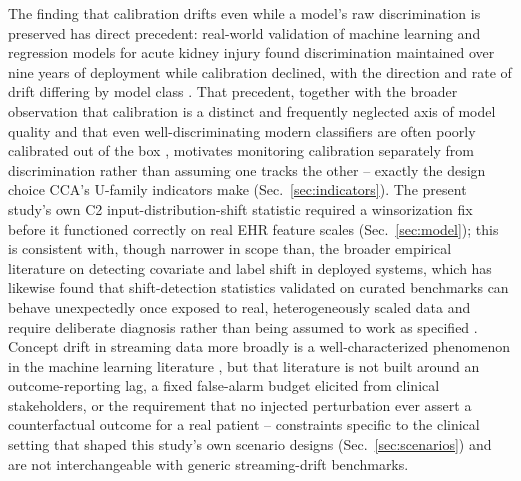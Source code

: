 \documentclass[preprintsapa,article,submit,oneauthor]{Definitions/mdpi}
\begin{document}
The finding that calibration drifts even while a model's raw discrimination is preserved has direct precedent: real-world validation of machine learning and regression models for acute kidney injury found discrimination maintained over nine years of deployment while calibration declined, with the direction and rate of drift differing by model class \citep{davis2017}. That precedent, together with the broader observation that calibration is a distinct and frequently neglected axis of model quality \citep{vancalster2019} and that even well-discriminating modern classifiers are often poorly calibrated out of the box \citep{guo2017}, motivates monitoring calibration separately from discrimination rather than assuming one tracks the other -- exactly the design choice CCA's U-family indicators make (Sec.~\ref{sec:indicators}). The present study's own C2 input-distribution-shift statistic required a winsorization fix before it functioned correctly on real EHR feature scales (Sec.~\ref{sec:model}); this is consistent with, though narrower in scope than, the broader empirical literature on detecting covariate and label shift in deployed systems, which has likewise found that shift-detection statistics validated on curated benchmarks can behave unexpectedly once exposed to real, heterogeneously scaled data and require deliberate diagnosis rather than being assumed to work as specified \citep{rabanser2019}. Concept drift in streaming data more broadly is a well-characterized phenomenon in the machine learning literature \citep{gama2014,lu2019}, but that literature is not built around an outcome-reporting lag, a fixed false-alarm budget elicited from clinical stakeholders, or the requirement that no injected perturbation ever assert a counterfactual outcome for a real patient -- constraints specific to the clinical setting that shaped this study's own scenario designs (Sec.~\ref{sec:scenarios}) and are not interchangeable with generic streaming-drift benchmarks.
\end{document}
